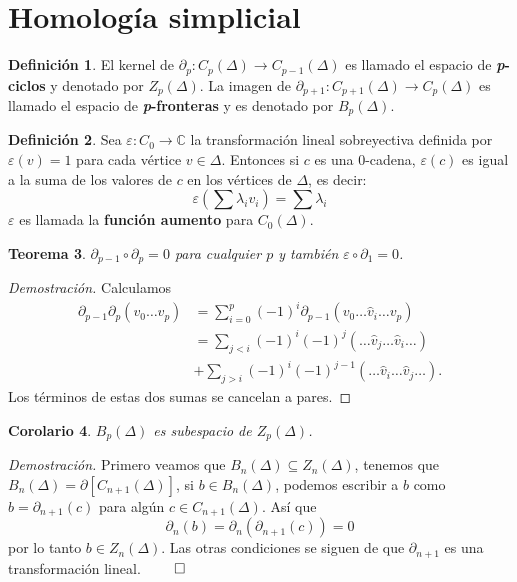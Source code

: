 \documentclass[12pt]{book}
\newtheorem{theorem}{Teorema}[section]
\newtheorem{corollary}[theorem]{Corolario}
\theoremstyle{definition}
\newtheorem{definition}[theorem]{Definición}
\newcounter{in}
\newcounter{ini}
\begin{document}
\section{Homología simplicial}
\label{hom-simp}

\begin{definition}
   El kernel de $\partial_{p}:C_{p}(\Delta)\rightarrow
   C_{p-1}(\Delta)$ es llamado el espacio de
   \textbf{\emph{p}-ciclos} y denotado por $Z_{p}(\Delta)$. La imagen
   de $\partial_{p+1}:C_{p+1}(\Delta)\rightarrow C_{p}(\Delta)$ es
   llamado el espacio de \textbf{\emph{p}-fronteras} y es denotado por $B_{p}(\Delta)$.
\end{definition}

\begin{definition}
  Sea $\varepsilon:C_{0}\rightarrow \mathbb{C}$ la transformación
  lineal sobreyectiva definida por $\varepsilon(v)=1$ para cada
  vértice $v\in \Delta$. Entonces si $c$ es una $0$-cadena,
  $\varepsilon(c)$ es igual a la suma de los valores de $c$ en los
  vértices de $\Delta$, es decir:
  $$\varepsilon(\sum \lambda_{i}v_{i})=\sum\lambda_{i}$$
  $\varepsilon$ es llamada la \textbf{función aumento} para
  $C_{0}(\Delta)$.
\end{definition}

\begin{theorem}
  $\partial_{p-1}\circ\partial_{p}=0$ para cualquier $p$ y también $\varepsilon\circ\partial_{1}=0$.
\end{theorem}

\begin{proof}[Demostración]
  Calculamos
  \begin{align*}
    \partial_{p-1}\partial_{p}(v_{0}\ldots
    v_{p})&=\sum_{i=0}^{p}(-1)^{i}\partial_{p-1}(v_{0}\ldots \widehat v_{i}\ldots v_{p})\\
    &=\sum_{j<i}(-1)^{i}(-1)^{j}(\ldots \widehat v_{j} \ldots \widehat v_{i} \ldots)\\
    &+\sum_{j>i}(-1)^{i}(-1)^{j-1}(\ldots\widehat v_{i}\ldots \widehat
    v_{j}\ldots).
  \end{align*}
  Los términos de estas dos sumas se cancelan a pares.
\end{proof}

\begin{corollary}
  $B_{p}(\Delta)$ es subespacio de $Z_{p}(\Delta)$.
\end{corollary}

\textit{Demostración.} Primero veamos que $B_{n}(\Delta)\subseteq Z_{n}(\Delta)$, tenemos que
$B_{n}(\Delta)=\partial[C_{n+1}(\Delta)]$, si $b\in B_{n}(\Delta)$,
podemos escribir a $b$ como $b=\partial_{n+1}(c)$ para algún $c\in
C_{n+1}(\Delta)$. Así que
$$\partial_{n}(b)=\partial_{n}(\partial_{n+1}(c))=0$$
por lo tanto $b\in Z_{n}(\Delta)$.
Las otras condiciones se siguen de que $\partial_{n+1}$ es una
transformación lineal. $\qed$
\end{document}
